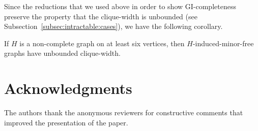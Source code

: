 \documentclass[envcountsame,envcountsect,11pt,a4paper]{llncs}
\begin{document}
Since the reductions that we used above in order to show GI-completeness preserve
the property that the clique-width is unbounded (see Subsection~\ref{subsec:intractable:cases}), we have the following corollary.
\begin{corollary}
If $H$ is a non-complete graph on at least six vertices,
then $H$-induced-minor-free graphs have unbounded clique-width.
\end{corollary}




\section*{Acknowledgments}
The authors thank the anonymous reviewers for constructive comments that improved the presentation of the paper.




\end{document}
